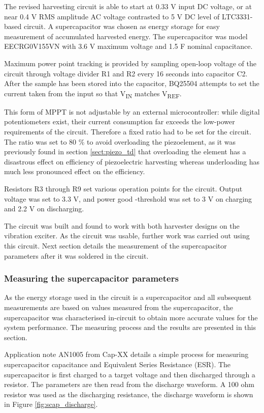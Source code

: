 The revised harvesting circuit is able to start at 0.33 V input DC voltage, or at near 0.4 V RMS amplitude AC voltage contrasted to 5 V DC level of LTC3331-based circuit. A supercapacitor was chosen as energy storage for easy measurement of accumulated harvested energy. The supercapacitor was model EECRG0V155VN \cite{panasonic_scap} with 3.6 V maximum voltage and 1.5 F nominal capacitance. 

Maximum power point tracking is provided by sampling open-loop voltage of the circuit through voltage divider R1 and R2 every 16 seconds into capacitor C2. After the sample has been stored into the capacitor, BQ25504 attempts to set the current taken from the input so that V\textsubscript{IN} matches V\textsubscript{REF}. 

This form of MPPT is not adjustable by an external microcontroller: while digital potentiometers exist, their current consumption far exceeds the low-power requirements of the circuit. Therefore a fixed ratio had to be set for the circuit. The ratio was set to 80 \% to avoid overloading the piezoelement, as it was previously found in section \ref{sect:piezo_td} that overloading the element has a disastrous effect on efficiency of piezoelectric harvesting whereas underloading has much less pronounced effect on the efficiency.

Resistors R3 through R9 set various operation points for the circuit. Output voltage was set to 3.3 V, and power good -threshold was set to 3 V on charging and 2.2 V on discharging. 

The circuit was built and found to work with both harvester designs on the vibration exciter. As the circuit was usable, further work was carried out using this circuit. Next section details the measurement of the supercapacitor parameters after it was soldered in the circuit.

\subsubsection{Measuring the supercapacitor parameters}
As the energy storage used in the circuit is a supercapacitor and all subsequent measurements are based on values measured from the supercapacitor, the supercapacitor was characterised in-circuit to obtain more accurate values for the system performance. The measuring process and the results are presented in this section.

Application note AN1005 from Cap-XX \cite{an1005} details a simple process for measuring supercapacitor capacitance and Equivalent Series Resistance (ESR). The supercapacitor is first charged to a target voltage and then discharged through a resistor. The parameters are then read from the discharge waveform. A 100 ohm resistor was used as the discharging resistance, the discharge waveform is shown in Figure \ref{fig:scap_discharge}. 

